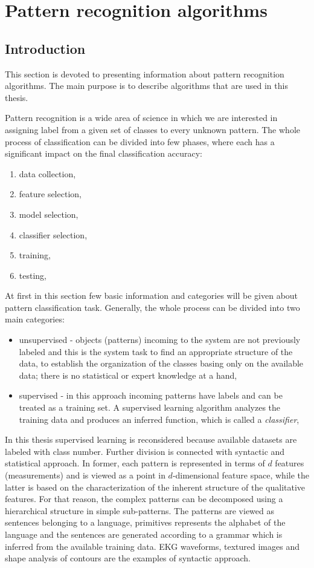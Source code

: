 \section{Pattern recognition algorithms}
\label{cha:Introduction}
\subsection{Introduction}
This section is devoted to presenting information about pattern recognition
algorithms. The main purpose is to describe algorithms that are used in this
thesis. 

Pattern recognition is a wide area of science in which we are interested in
assigning label from a given set of classes to every unknown pattern. The whole 
process of classification can be divided into few phases, where each has a
significant impact on the final classification accuracy:
\begin{enumerate}
    \item data collection,
    \item feature selection,
    \item model selection,
    \item classifier selection,
    \item training,
    \item testing,
\end{enumerate}
At first in this section few basic information and categories will be given 
about pattern classification task. Generally, the whole process
can be divided into two main categories:
\begin{itemize}
    \item unsupervised - objects (patterns) incoming to the system are not previously
        labeled and this is the system task to find an appropriate structure of
        the data, to establish the organization of the classes basing only on
        the available data; there is no statistical or expert knowledge at a
        hand,
    \item supervised - in this approach incoming patterns have labels and can
        be treated as a training set. A supervised learning algorithm analyzes the 
        training data and produces an inferred function, which is called a \textit{classifier},
\end{itemize}
In this thesis supervised learning is reconsidered because available datasets 
are labeled with class number. Further division is connected with syntactic and statistical 
approach. In former, each pattern is represented in terms of 
$d$ features (measurements) and is viewed as a point in
$d$-dimensional feature space, while the latter
is based on the characterization of the inherent structure of the 
qualitative features. For that  reason, the complex patterns can be
decomposed using a hierarchical structure in simple  sub-patterns.
The patterns are viewed as sentences belonging to a language, primitives
represents the alphabet of the language and the sentences are generated
according to a grammar which is inferred from the available training data.
EKG waveforms, textured images and shape analysis of contours are the examples
of syntactic approach.

